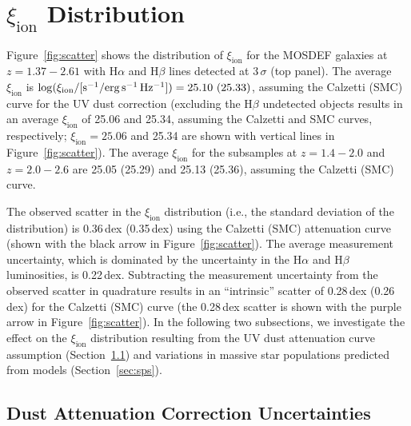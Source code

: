 \documentclass[iop]{emulateapj}
\newcommand{\xiion}{\ensuremath{\xi_{\mathrm{ion}}}}
\newcommand{\halpha}{H\ensuremath{\alpha}}
\newcommand{\hbeta}{H\ensuremath{\beta}}
\begin{document}
\section{{\xiion} Distribution}
\label{sec:scatter}

Figure~\ref{fig:scatter} shows the distribution of {\xiion} for the MOSDEF galaxies at $z=1.37-2.61$ with {\halpha} and {\hbeta} lines detected at 3\,$\sigma$ (top panel). The average {\xiion} is $\log(\xi_{\rm{ion}}/[{\rm{s^{-1}/erg\,s^{-1}\,Hz^{-1}}}])=25.10~(25.33)$, assuming the Calzetti (SMC) curve for the UV dust correction (excluding the {\hbeta} undetected objects results in an average {\xiion} of 25.06 and 25.34, assuming the Calzetti and SMC curves, respectively; {\xiion}$=25.06$ and 25.34 are shown with vertical lines in Figure~\ref{fig:scatter}).
The average {\xiion} for the subsamples at $z=1.4-2.0$ and $z=2.0-2.6$ are 25.05 (25.29) and 25.13 (25.36), assuming the Calzetti (SMC) curve.

The observed scatter in the {\xiion} distribution (i.e., the standard deviation of the distribution) is 0.36\,dex (0.35\,dex) using the Calzetti (SMC) attenuation curve (shown with the black arrow in Figure~\ref{fig:scatter}). The average measurement uncertainty, which is dominated by the uncertainty in the {\halpha} and {\hbeta} luminosities, is 0.22\,dex. Subtracting the measurement uncertainty from the observed scatter in quadrature results in an ``intrinsic'' scatter of 0.28\,dex (0.26\,dex) for the Calzetti (SMC) curve (the 0.28\,dex scatter is shown with the purple arrow in Figure~\ref{fig:scatter}).
In the following two subsections, we investigate the effect on the {\xiion} distribution resulting from the UV dust attenuation curve assumption (Section~\ref{sec:dustcurve}) and variations in massive star populations predicted from models (Section~\ref{sec:sps}). 

\subsection{Dust Attenuation Correction Uncertainties}
\label{sec:dustcurve}
\end{document}
